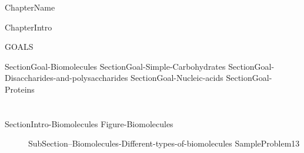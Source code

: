 \documentclass[main.tex]{subfiles}
\newcommand\chapterlabel{Ch-biochemistry}\setcounter{figurenewcounter}{0}\setcounter{tablenewcounter}{0}\setcounter{formulanewcounter}{0}
\begin{document}
 {ChapterName}

\begin{marginfigure}
      \texttt{[image: ../\{\\chapterlabel]}/figure1}
   \end{marginfigure}

 {ChapterIntro}

\begin{marginfigure}%
\begin{mytcbox}{GOALS}

\begin{enumerate}[label=\protect\circled{\color{white}\arabic*}]
 {SectionGoal-Biomolecules}
  {SectionGoal-Simple-Carbohydrates}
 {SectionGoal-Disaccharides-and-polysaccharides}
 {SectionGoal-Nucleic-acids}
 {SectionGoal-Proteins}
\end{enumerate}
\end{mytcbox}
\end{marginfigure}%


\section{\color{blue!30!black}{Biomolecules}}
{SectionIntro-Biomolecules}
{Figure-Biomolecules}
\sloppy\begin{description}
\item[] {SubSection--Biomolecules-Different-types-of-biomolecules}
{SampleProblem13}
\end{description}
\end{document}
